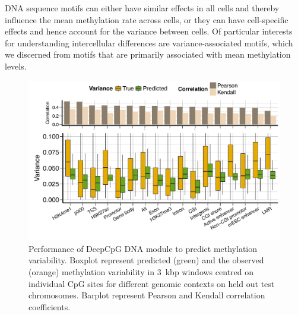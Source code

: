 DNA sequence motifs can either have similar effects in all cells and thereby influence the mean methylation rate across cells, or they can have cell-specific effects and hence account for the variance between cells. Of particular interests for understanding intercellular differences are variance-associated motifs, which we discerned from motifs that are primarily associated with mean methylation levels.

\begin{figure}[htbp!]
\centering
\includegraphics[width=1.0\textwidth]{var_var}
\caption[Performance of DeepCpG DNA module to predict methylation variability.]{Performance of DeepCpG DNA module to predict methylation variability. Boxplot represent predicted (green) and the observed (orange) methylation variability in 3~kbp windows centred on individual CpG sites for different genomic contexts on held out test chromosomes. Barplot represent Pearson and Kendall correlation coefficients.}
\label{fig:dcpg_var_var}
\end{figure}

